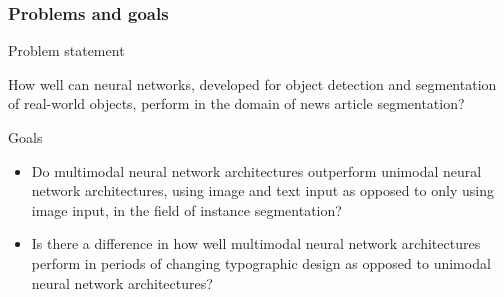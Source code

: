 \documentclass[aspectratio=1610]{beamer}
\begin{document}
\begin{frame}
  \frametitle{Problems and goals}

  \begin{Large}
    Problem statement
  \end{Large}

  \begin{small}
  How well can neural networks, developed for object detection and
segmentation of real-world objects, perform in the domain of news article
segmentation?
  \break
  \end{small}

  \begin{Large}
    Goals 
  \end{Large}


  \begin{small}
    \begin{itemize}
    \item Do multimodal neural network architectures outperform unimodal neural
network architectures, using image and text input as opposed to only
using image input, in the field of instance segmentation?
    \item Is there a difference in how well multimodal neural network architectures
perform in periods of changing typographic design as opposed to
unimodal neural network architectures?
    \end{itemize}
  \end{small}

\end{frame}
\normalpage

\normalpage
\end{document}
